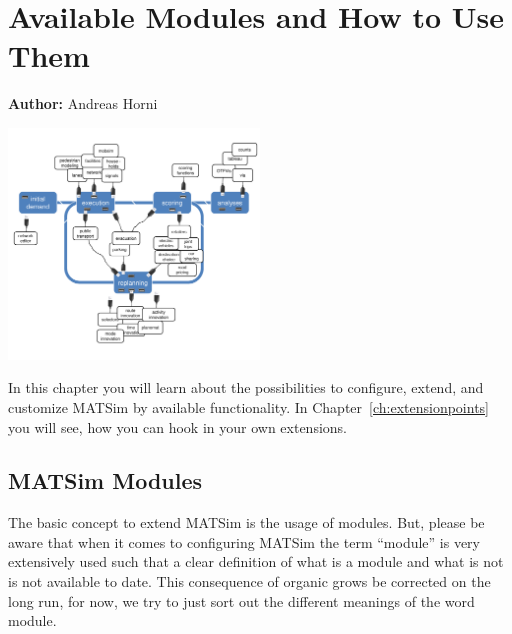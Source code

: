 \chapter{Available Modules and How to Use Them}
\label{ch:modules}

\hfill \textbf{Author:} Andreas Horni

\begin{center} \includegraphics[width=0.5\textwidth, angle=0]{extending/figures/modules.pdf} \end{center}

In this chapter you will learn about the possibilities to configure, extend, and customize MATSim by available functionality. In Chapter~\ref{ch:extensionpoints} you will see, how you can hook in your own extensions.


\section{MATSim Modules}
The basic concept to extend MATSim is the usage of modules. But, please be aware that when it comes to configuring MATSim the term ``module'' is very extensively used such that a clear definition of what is a module and what is not is not available to date. This consequence of organic grows be corrected on the long run, for now, we try to just sort out the different meanings of the word module.


